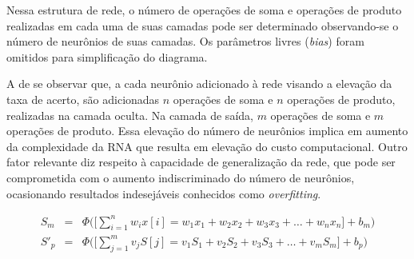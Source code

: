 Nessa estrutura de rede, o número de operações de soma e operações de produto realizadas em cada uma de suas camadas pode ser determinado observando-se o número de neurônios de suas camadas. Os parâmetros livres (\textit{bias}) foram omitidos para simplificação do diagrama.


A de se observar que, a cada neurônio adicionado à rede visando a elevação da taxa de acerto, são adicionadas $n$ operações de soma e $n$ operações de produto, realizadas na camada oculta. Na camada de saída, $m$ operações de soma e $m$ operações de produto. Essa elevação do número de neurônios implica em aumento da complexidade da RNA \cite{oliveira2000, reyes2012} que resulta em elevação do custo computacional. Outro fator relevante diz respeito à capacidade de generalização da rede, que pode ser comprometida com o aumento indiscriminado do número de neurônios, ocasionando resultados indesejáveis conhecidos como \textit{overfitting}.

\begin{eqnarray}
S_m  &=& \Phi\Big(\Big[\sum_{i=1}^n w_ix[i] = w_1x_1 + w_2x_2 + w_3x_3 + \ldots + w_nx_n \Big]+b_m\Big) \label{eq:CamOcul} \\
S'_p &=& \Phi\Big(\Big[\sum_{j=1}^m v_jS[j] = v_1S_1 + v_2S_2 + v_3S_3 + \ldots + v_mS_m \Big]+b_p\Big) \label{eq:CamSaid}
\end{eqnarray}

%
%


